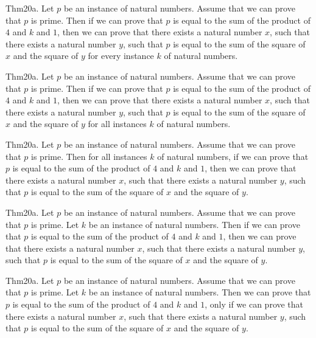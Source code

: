 \documentclass{article}
\begin{document}
Thm20a. Let $p$ be an instance of natural numbers. Assume that we can prove that $p$ is prime. Then if we can prove that $p$ is equal to the sum of the product of $4$ and $k$ and $1$, then we can prove that there exists a natural number $x$, such that there exists a natural number $y$, such that $p$ is equal to the sum of the square of $x$ and the square of $y$ for every instance $k$ of natural numbers.

Thm20a. Let $p$ be an instance of natural numbers. Assume that we can prove that $p$ is prime. Then if we can prove that $p$ is equal to the sum of the product of $4$ and $k$ and $1$, then we can prove that there exists a natural number $x$, such that there exists a natural number $y$, such that $p$ is equal to the sum of the square of $x$ and the square of $y$ for all instances $k$ of natural numbers.

Thm20a. Let $p$ be an instance of natural numbers. Assume that we can prove that $p$ is prime. Then for all instances $k$ of natural numbers, if we can prove that $p$ is equal to the sum of the product of $4$ and $k$ and $1$, then we can prove that there exists a natural number $x$, such that there exists a natural number $y$, such that $p$ is equal to the sum of the square of $x$ and the square of $y$.

Thm20a. Let $p$ be an instance of natural numbers. Assume that we can prove that $p$ is prime. Let $k$ be an instance of natural numbers. Then if we can prove that $p$ is equal to the sum of the product of $4$ and $k$ and $1$, then we can prove that there exists a natural number $x$, such that there exists a natural number $y$, such that $p$ is equal to the sum of the square of $x$ and the square of $y$.

Thm20a. Let $p$ be an instance of natural numbers. Assume that we can prove that $p$ is prime. Let $k$ be an instance of natural numbers. Then we can prove that $p$ is equal to the sum of the product of $4$ and $k$ and $1$, only if we can prove that there exists a natural number $x$, such that there exists a natural number $y$, such that $p$ is equal to the sum of the square of $x$ and the square of $y$.
\end{document}
